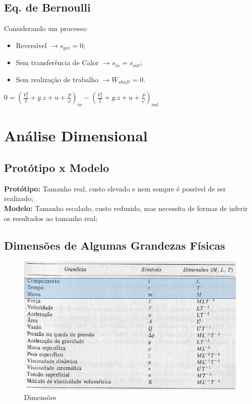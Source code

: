 \documentclass[a4paper, 12pt]{article}
\begin{document}
\subsection{Eq. de Bernoulli}
	Considerando um processo:
	\begin{itemize}
		\item Reversível $\longrightarrow s_{ger} = 0$;
		\item Sem transferência de Calor $\longrightarrow s_{in} = s_{out}$;
		\item Sem realização de trabalho $\longrightarrow W_{shaft} = 0$.
	\end{itemize}

	\begin{center}
		\Large
		$
		0 = (\frac{V_I^2}{2} + g.z + u + \frac{P}{\varphi})_{in} - (\frac{V_I^2}{2} + g.z + u + \frac{P}{\varphi} )_{out}
		$
	\end{center}

\section{Análise Dimensional}
\subsection{Protótipo x Modelo}
	\textbf{Protótipo:}
	Tamanho real, custo elevado e nem sempre é possível de ser realizado;\\
	
	\textbf{Modelo:}
	Tamanho escalado, custo reduzido, mas necessita de formas de inferir os resultados ao tamanho real;

\subsection{Dimensões de Algumas Grandezas Físicas}
\begin{figure}[h]
	\centering
	\includegraphics[width=0.9\linewidth]{imagens/dim}
	\caption{Dimensões}
	\label{fig:dim}
\end{figure}
\end{document}
